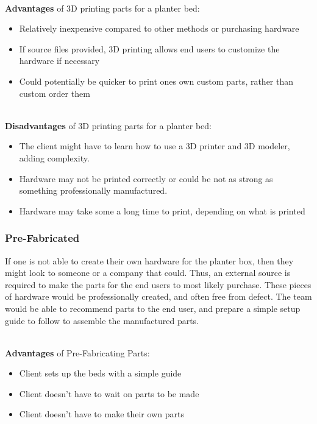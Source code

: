 	\noindent \\ \textbf{Advantages} of 3D printing parts for a planter bed:
	\begin{itemize}
		\item Relatively inexpensive compared to other methods or purchasing hardware
		\item If source files provided, 3D printing allows end users to customize the hardware if necessary
		\item Could potentially be quicker to print ones own custom parts, rather than custom order them
	\end{itemize}

	\noindent \\ \textbf{Disadvantages} of 3D printing parts for a planter bed:
	\begin{itemize}
		\item The client might have to learn how to use a 3D printer and 3D modeler, adding complexity.
		\item Hardware may not be printed correctly or could be not as strong as something professionally manufactured.
		\item Hardware may take some a long time to print, depending on what is printed
	\end{itemize}

	\newpage %

	\subsubsection{Pre-Fabricated}
	If one is not able to create their own hardware for the planter box, then they might look to someone or a company that could.  Thus, an external source is
	required to make the parts for the end users to most likely purchase.  These pieces of hardware would be professionally created, and often free from
	defect.  The team would be able to recommend parts to the end user, and prepare a simple setup guide to follow to assemble the manufactured parts.

	\noindent \\ \textbf{Advantages} of Pre-Fabricating Parts:
	\begin{itemize}
		\item Client sets up the beds with a simple guide
		\item Client doesn't have to wait on parts to be made
		\item Client doesn't have to make their own parts
	\end{itemize}

